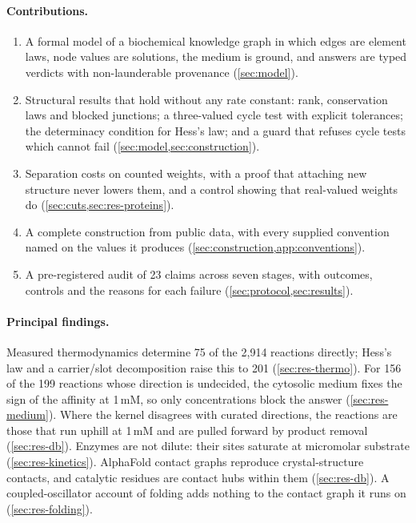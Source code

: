 \paragraph{Contributions.}
\begin{enumerate}[leftmargin=*,itemsep=2pt]
  \item A formal model of a biochemical knowledge graph in which edges are element laws, node values are solutions, the medium is ground, and answers are typed verdicts with non-launderable provenance (\cref{sec:model}).
  \item Structural results that hold without any rate constant: rank, conservation laws and blocked junctions; a three-valued cycle test with explicit tolerances; the determinacy condition for Hess's law; and a guard that refuses cycle tests which cannot fail (\cref{sec:model,sec:construction}).
  \item Separation costs on counted weights, with a proof that attaching new structure never lowers them, and a control showing that real-valued weights do (\cref{sec:cuts,sec:res-proteins}).
  \item A complete construction from public data, with every supplied convention named on the values it produces (\cref{sec:construction,app:conventions}).
  \item A pre-registered audit of 23 claims across seven stages, with outcomes, controls and the reasons for each failure (\cref{sec:protocol,sec:results}).
\end{enumerate}

\paragraph{Principal findings.}
Measured thermodynamics determine 75 of the 2{,}914 reactions directly; Hess's law and a carrier/slot decomposition raise this to 201 (\cref{sec:res-thermo}).
For 156 of the 199 reactions whose direction is undecided, the cytosolic medium fixes the sign of the affinity at 1\,mM, so only concentrations block the answer (\cref{sec:res-medium}).
Where the kernel disagrees with curated directions, the reactions are those that run uphill at 1\,mM and are pulled forward by product removal (\cref{sec:res-db}).
Enzymes are not dilute: their sites saturate at micromolar substrate (\cref{sec:res-kinetics}).
AlphaFold contact graphs reproduce crystal-structure contacts, and catalytic residues are contact hubs within them (\cref{sec:res-db}).
A coupled-oscillator account of folding adds nothing to the contact graph it runs on (\cref{sec:res-folding}).

